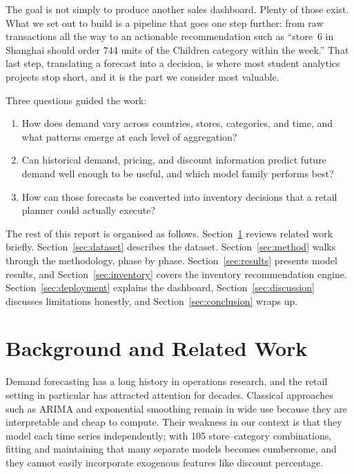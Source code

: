 \documentclass[11pt,a4paper]{article}
\begin{document}
The goal is not simply to produce another sales dashboard. Plenty of those exist. What we set out to build is a pipeline that goes one step further: from raw transactions all the way to an actionable recommendation such as ``store~6 in Shanghai should order 744 units of the Children category within the week.'' That last step, translating a forecast into a decision, is where most student analytics projects stop short, and it is the part we consider most valuable.

Three questions guided the work:

\begin{enumerate}[leftmargin=1.5em]
\item How does demand vary across countries, stores, categories, and time, and what patterns emerge at each level of aggregation?
\item Can historical demand, pricing, and discount information predict future demand well enough to be useful, and which model family performs best?
\item How can those forecasts be converted into inventory decisions that a retail planner could actually execute?
\end{enumerate}

The rest of this report is organised as follows. Section~\ref{sec:related} reviews related work briefly. Section~\ref{sec:dataset} describes the dataset. Section~\ref{sec:method} walks through the methodology, phase by phase. Section~\ref{sec:results} presents model results, and Section~\ref{sec:inventory} covers the inventory recommendation engine. Section~\ref{sec:deployment} explains the dashboard, Section~\ref{sec:discussion} discusses limitations honestly, and Section~\ref{sec:conclusion} wraps up.

\section{Background and Related Work}\label{sec:related}

Demand forecasting has a long history in operations research, and the retail setting in particular has attracted attention for decades. Classical approaches such as ARIMA and exponential smoothing remain in wide use because they are interpretable and cheap to compute. Their weakness in our context is that they model each time series independently; with 105 store--category combinations, fitting and maintaining that many separate models becomes cumbersome, and they cannot easily incorporate exogenous features like discount percentage.
\end{document}
